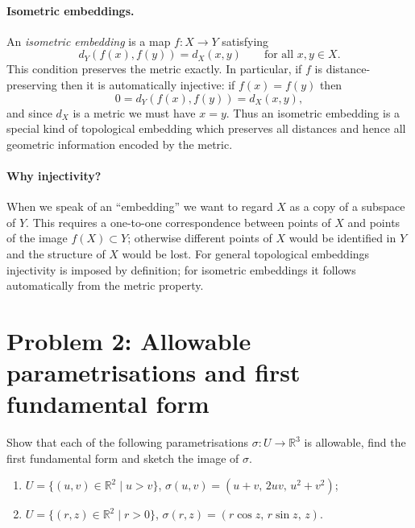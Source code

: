 \documentclass[12pt,a4paper]{article}
\theoremstyle{plain}
\theoremstyle{definition}      %
\begin{document}
	\paragraph{Isometric embeddings.}
	An \emph{isometric embedding} is a map $f:X\to Y$ satisfying
	\[
	d_Y(f(x),f(y)) = d_X(x,y)\qquad\text{for all }x,y\in X.
	\]
	This condition preserves the metric exactly.  In particular, if $f$ is
	distance-preserving then it is automatically injective: if $f(x)=f(y)$ then
	\[
	0 = d_Y(f(x),f(y)) = d_X(x,y),
	\]
	and since $d_X$ is a metric we must have $x=y$.  Thus an isometric embedding
	is a special kind of topological embedding which preserves all distances and
	hence all geometric information encoded by the metric.
	
	\paragraph{Why injectivity?}
	When we speak of an ``embedding'' we want to regard $X$ as a copy of a
	subspace of $Y$.  This requires a one-to-one correspondence between points of
	$X$ and points of the image $f(X)\subset Y$; otherwise different points of $X$
	would be identified in $Y$ and the structure of $X$ would be lost.  For
	general topological embeddings injectivity is imposed by definition; for
	isometric embeddings it follows automatically from the metric property.
	
	
	
	\section*{Problem 2: Allowable parametrisations and first fundamental form}
	
	Show that each of the following parametrisations $\sigma : U \to \mathbb{R}^3$
	is allowable, find the first fundamental form and sketch the image of $\sigma$.
	\begin{enumerate}[label=\textnormal{(\alph*)}]
		\item $U = \{(u,v)\in\mathbb{R}^2 \mid u>v\}$,
		\quad $\sigma(u,v) = (u+v,\,2uv,\,u^2+v^2)$;
		\item $U = \{(r,z)\in\mathbb{R}^2 \mid r>0\}$,
		\quad $\sigma(r,z) = (r\cos z,\,r\sin z,\,z)$.
	\end{enumerate}
	
	
	
	
\end{document}
